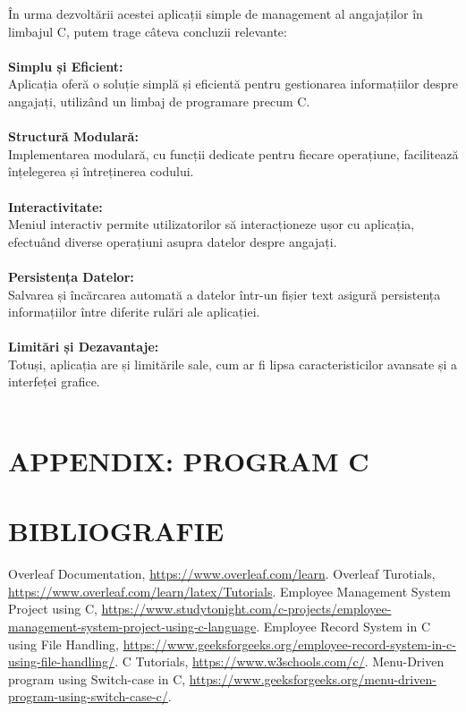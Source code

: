 \documentclass[12pt,a4paper]{article}
\begin{document}
În urma dezvoltării acestei aplicații simple de management al angajaților în limbajul C, putem trage câteva concluzii relevante:\\\\
\textbf{Simplu și Eficient:\\}
Aplicația oferă o soluție simplă și eficientă pentru gestionarea informațiilor despre angajați, utilizând un limbaj de programare precum C.\\\\
\textbf{Structură Modulară:\\}
Implementarea modulară, cu funcții dedicate pentru fiecare operațiune, facilitează înțelegerea și întreținerea codului.\\\\
\textbf{Interactivitate:\\}
Meniul interactiv permite utilizatorilor să interacționeze ușor cu aplicația, efectuând diverse operațiuni asupra datelor despre angajați.\\\\
\textbf{Persistența Datelor:\\}
Salvarea și încărcarea automată a datelor într-un fișier text asigură persistența informațiilor între diferite rulări ale aplicației.\\\\
\textbf{Limitări și Dezavantaje:\\}
Totuși, aplicația are și limitările sale, cum ar fi lipsa caracteristicilor avansate și a interfeței grafice.\\\\

\section{APPENDIX: PROGRAM C}



\section{BIBLIOGRAFIE}
\begin{thebibliography}{9}
\label{sec_ref}
    Overleaf Documentation, {\small \url{https://www.overleaf.com/learn}}. 
    Overleaf Turotials, {\small \url{https://www.overleaf.com/learn/latex/Tutorials}}. 
   Employee Management System Project using C, {\small \url{https://www.studytonight.com/c-projects/employee-management-system-project-using-c-language}}. 
   Employee Record System in C using File Handling, {\small \url{https://www.geeksforgeeks.org/employee-record-system-in-c-using-file-handling/}}. 
   C Tutorials, {\small \url{https://www.w3schools.com/c/}}. 
    Menu-Driven program using Switch-case in C, {\small \url{https://www.geeksforgeeks.org/menu-driven-program-using-switch-case-c/}}. 
    
\end{thebibliography}
\end{document}
